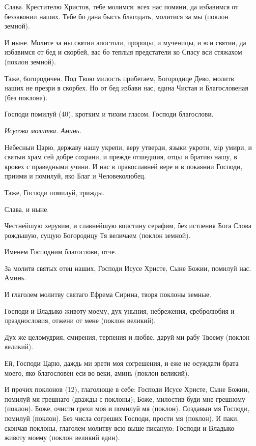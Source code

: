 Слава. Крестителю Христов, тебе молимся: всех нас помяни, да избавимся от беззаконии наших. Тебе бо дана бысть благодать, молитися за мы (поклон земной).

И ныне. Молите за ны святии апостоли, пророцы, и мученицы, и вси святии, да избавимся от бед и скорбей, вас бо теплыя предстатели ко Спасу вси стяжахом (поклон земной).

Таже, 6огородичен. Под Твою милость прибегаем, Богородице Дево, молитв наших не презри в скорбех. Но от бед избави нас, едина Чистая и Благословеная (без поклона).

Господи помилуй (40), кротким и тихим гласом. Господи благослови.

\itshape Исусова молитва.\normalfont{} Аминь. 

Небесныи Царю, державу нашу укрепи, веру утверди, языки укроти, мiр умири, и святыи храм сей добре сохрани, и прежде отшедшия, отцы и братию нашу, в кровех с праведными учини. И нас в православней вере и в покаянии Господи, приими и помилуй, яко Благ и Человеколюбец. 

Таже, Господи помилуй, трижды.

Слава, и ныне.

Честнейшую херувим, и славнейшую воистину серафим, без истления Бога Слова рождьшую, сущую Богородицу Тя величаем (поклон земной).

Именем Господним благослови, отче.

За молитв святых отец наших, Господи Исусе Христе, Сыне Божии, помилуй нас. Аминь. 

И глаголем молитву святаго Ефрема Сирина, творя поклоны земные.

Господи и Владыко животу моему, дух уныния, небрежения, сребролюбия и празднословия, отжени от мене (поклон великий).

Дух же целомудрия, смирения, терпения и любве, даруй ми рабу Твоему (поклон великий).

Ей, Господи Царю, даждь ми зрети моя согрешения, и еже не осуждати брата моего, яко благословен еси во веки, аминь (поклон великий).

И прочих поклонов (12), глаголюще в себе: Господи Исусе Христе, Сыне Божии, помилуй мя грешнаго (дважды с поклоны); Боже, милостив буди мне грешному (поклон). Боже, очисти грехи моя и помилуй мя (поклон). Создавыи мя Господи, помилуй (поклон). Без числа согреших Господи, прости мя (поклон). И паки, скончав поклоны, глаголем молитву всю выше писаную: Господи и Владыко животу моему (поклон великий един).

